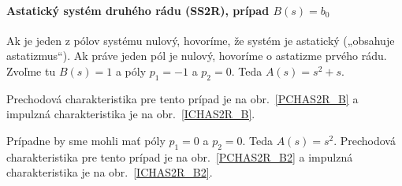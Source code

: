 \documentclass[a4paper, 10pt, ]{article}
\begin{document}
\paragraph{Astatický systém druhého rádu (SS2R), prípad $B(s) = b_0$}

Ak je jeden z pólov systému nulový, hovoríme, že systém je astatický („obsahuje astatizmus“). Ak práve jeden pól je nulový, hovoríme o astatizme prvého rádu. Zvoľme tu $B(s) = 1$ a póly $p_1 = -1$ a $p_2 = 0$. Teda $A(s) = s^2 + s$.

Prechodová charakteristika pre tento prípad je na obr.~\ref{PCHAS2R_B} a impulzná charakteristika je na obr.~\ref{ICHAS2R_B}.

\begin{center}


	\label{PCHAS2R_B}

\end{center}








\begin{center}


	\label{ICHAS2R_B}

\end{center}

Prípadne by sme mohli mať póly $p_1 = 0$ a $p_2 = 0$. Teda $A(s) = s^2$. Prechodová charakteristika pre tento prípad je na obr.~\ref{PCHAS2R_B2} a impulzná charakteristika je na obr.~\ref{ICHAS2R_B2}.

\begin{center}


	\label{PCHAS2R_B2}

\end{center}

\begin{center}


	\label{ICHAS2R_B2}

\end{center}
\end{document}
